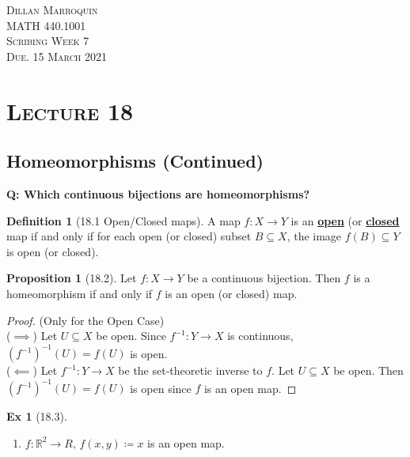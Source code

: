 \documentclass{article}
\newcommand{\R}{\ensuremath{\mathbb{R}}}
\newcommand{\Iff}{if and only if}
\newcommand{\coleq}{\ensuremath{\coloneqq}}
\newcommand{\define}[1]{\textbf{\underline{#1}}}
\newcommand{\func}[3]{\ensuremath{#1: #2 \to #3}}
\renewcommand{\Subset}{\subseteq}
\theoremstyle{definition}
\newtheorem*{defn}{Definition}
\newtheorem*{prop}{Proposition}
\newtheorem*{ex}{Ex}
\theoremstyle{remark}
\begin{document}
    \begin{center}
        \textsc{Dillan Marroquin\\MATH 440.1001\\Scribing Week 7\\Due. 15 March 2021\\}
    \end{center}
        
    \noindent\section*{\textbf{\textsc{Lecture 18}}}{
        \subsection*{Homeomorphisms (Continued)}
            \textbf{Q: Which continuous bijections are homeomorphisms?}
            
            \begin{defn}[18.1 Open/Closed maps]
                A map $\func{f}{X}{Y}$ is an \define{open} (or \define{closed} map \Iff{} for each open (or closed) subset $B \Subset X$, the image $f(B) \Subset Y$ is open (or closed).
            \end{defn}
            
            \begin{prop}[18.2]
                Let $\func{f}{X}{Y}$ be a continuous bijection. Then $f$ is a homeomorphism \Iff{} $f$ is an open (or closed) map.
            \end{prop}
            
            \begin{proof}(Only for the Open Case)\\
                ($\implies$) Let $U \Subset X$ be open. Since $\func{f^{-1}}{Y}{X}$ is continuous, $(f^{-1})^{-1}(U)=f(U)$ is open.\\
                ($\impliedby$) Let $\func{f^{-1}}{Y}{X}$ be the set-theoretic inverse to $f$. Let $U \Subset X$ be open. Then $(f^{-1})^{-1}(U)=f(U)$ is open since $f$ is an open map.
            \end{proof}
            
            \begin{ex}[18.3]\hfill
                \begin{enumerate}
                    \item $\func{f}{\R^2}{R}, \, f(x,y) \coleq x$ is an open map.
                        

\end{enumerate}
\end{ex}}
\end{document}
